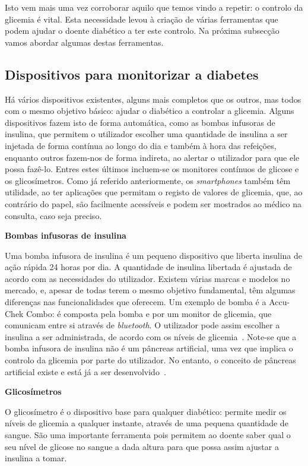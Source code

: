 Isto vem mais uma vez corroborar aquilo que temos vindo a repetir: o controlo da glicemia é vital. Esta necessidade levou à criação de várias ferramentas que podem ajudar o doente diabético a ter este controlo. Na próxima subsecção vamos abordar algumas destas ferramentas.


\subsection{Dispositivos para monitorizar a diabetes}

Há vários dispositivos existentes, alguns mais completos que os outros, mas todos com o mesmo objetivo básico: ajudar o diabético a controlar a glicemia. Alguns dispositivos fazem isto de forma automática, como as bombas infusoras de insulina, que permitem o utilizador escolher uma quantidade de insulina a ser injetada de forma contínua ao longo do dia e também à hora das refeições, enquanto outros fazem-nos de forma indireta, ao alertar o utilizador para que ele possa fazê-lo. Entres estes últimos incluem-se os monitores contínuos de glicose e os glicosímetros. 
Como já referido anteriormente, os \textit{smartphones} também têm utilidade, ao ter aplicações que permitam o registo de valores de glicemia, que, ao contrário do papel, são facilmente acessíveis e podem ser mostrados ao médico na consulta, caso seja preciso.\newpage

\textbf{Bombas infusoras de insulina}

Uma bomba infusora de insulina é um pequeno dispositivo que liberta insulina de ação rápida 24 horas por dia. A quantidade de insulina libertada é ajustada de acordo com as necessidades do utilizador. Existem várias marcas e modelos no mercado, e, apesar de todas terem o mesmo objetivo fundamental, têm algumas diferenças nas funcionalidades que oferecem. Um exemplo de bomba é a Accu-Chek Combo: é composta pela bomba e por um monitor de glicemia, que comunicam entre si através de \textit{bluetooth}. O utilizador pode assim escolher a insulina a ser administrada, de acordo com os níveis de glicemia~\cite{akku}. Note-se que a bomba infusora de insulina não é um pâncreas artificial, uma vez que implica o controlo da glicemia por parte do utilizador. No entanto, o conceito de pâncreas artificial existe e está já a ser desenvolvido~\cite{pancreas}.

\textbf{Glicosímetros}

O glicosímetro é o dispositivo base para qualquer diabético: permite medir os níveis de glicemia a qualquer instante, através de uma pequena quantidade de sangue. São uma importante ferramenta pois permitem ao doente saber qual o seu nível de glicose no sangue a dada altura para que possa assim ajustar a insulina a tomar.


